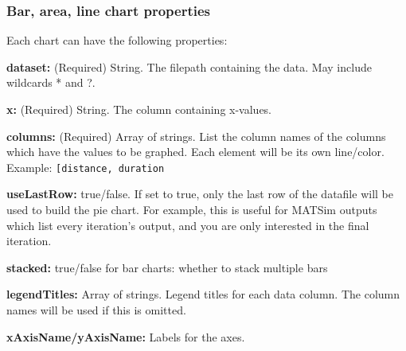 \hypertarget{bar-area-line-chart-properties}{%
\subsubsection{Bar, area, line chart properties}\label{bar-area-line-chart-properties}}

Each chart can have the following properties:

\noindent\textbf{dataset:} (Required) String. The filepath containing the data.
May include wildcards * and ?.

\noindent\textbf{x:} (Required) String. The column containing x-values.

\noindent\textbf{columns:} (Required) Array of strings. List the column names of
the columns which have the values to be graphed. Each element will be
its own line/color. Example:
\texttt{{[}\textquotesingle{}distance\textquotesingle{},\ \textquotesingle{}duration\textquotesingle{}{]}}

\noindent\textbf{useLastRow:} true/false. If set to true, only the last row of
the datafile will be used to build the pie chart. For example, this is
useful for MATSim outputs which list every iteration's output, and you
are only interested in the final iteration.

\noindent\textbf{stacked:} true/false for bar charts: whether to stack multiple
bars

\noindent\textbf{legendTitles:} Array of strings. Legend titles for each data
column. The column names will be used if this is omitted.

\noindent\textbf{xAxisName/yAxisName:} Labels for the axes.
